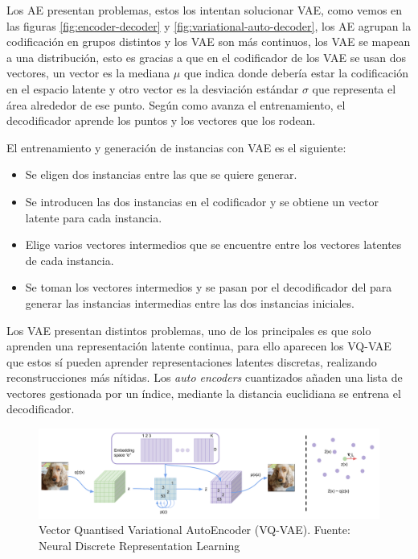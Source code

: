 Los \gls{AE} presentan problemas, estos los intentan solucionar \gls{VAE}, como vemos en las figuras \ref{fig:encoder-decoder} y \ref{fig:variational-auto-decoder}, los \gls{AE} agrupan la codificación en grupos distintos y los \gls{VAE} son más continuos, los \gls{VAE} se mapean a una distribución, esto es gracias a que en el codificador de los \gls{VAE} se usan dos vectores, un vector es la mediana ${\mu}$ que indica donde debería estar la codificación en el espacio latente y otro vector es la desviación estándar ${\sigma}$ que representa el área alrededor de ese punto. Según como avanza el entrenamiento, el decodificador aprende los puntos y los vectores que los rodean. \cite{alihamzaaliasiaVQVAE}

El entrenamiento y generación de instancias con \gls{VAE} es el siguiente:

\begin{itemize}
    \item Se eligen dos instancias entre las que se quiere generar.
    \item Se introducen las dos instancias en el codificador y se obtiene un vector latente para cada instancia.
    \item Elige varios vectores intermedios que se encuentre entre los vectores latentes de cada instancia.
    \item Se toman los vectores intermedios y se pasan por el decodificador del para generar las instancias intermedias entre las dos instancias iniciales.
\end{itemize}

Los \gls{VAE} presentan distintos problemas, uno de los principales es que solo aprenden una representación latente continua, para ello aparecen los \gls{VQ-VAE} que estos sí pueden aprender representaciones latentes discretas, realizando reconstrucciones más nítidas. Los \textit{auto encoders} cuantizados añaden una lista de vectores gestionada por un índice, mediante la distancia euclidiana se entrena el decodificador.

\begin{figure}[H]
    \centering
    \includegraphics[width=1\linewidth]{figures/chapter02/VQ-VAE.png}
    \caption{Vector Quantised Variational AutoEncoder (VQ-VAE). \newline{}Fuente: Neural Discrete Representation Learning \cite{oord2018neuraldiscreterepresentationlearning}}
    \label{fig:vq-vae}
\end{figure}